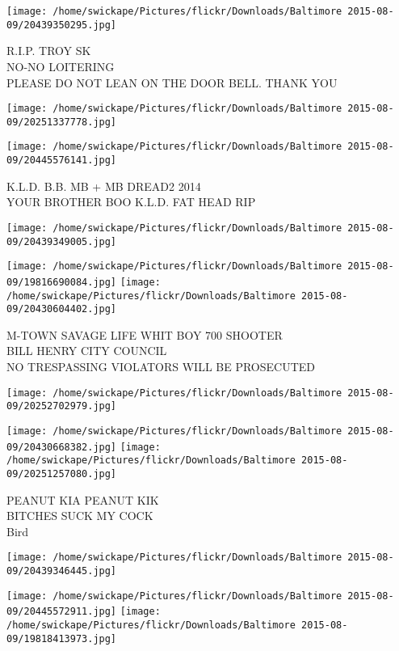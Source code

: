 \documentclass[10pt,letterpaper]{article}
\begin{document}
\texttt{[image: /home/swickape/Pictures/flickr/Downloads/Baltimore 2015-08-09/20439350295.jpg]}

R.I.P. TROY SK\\
NO{-}NO LOITERING\\
PLEASE DO NOT LEAN ON THE DOOR BELL.  THANK YOU
\pagebreak

\texttt{[image: /home/swickape/Pictures/flickr/Downloads/Baltimore 2015-08-09/20251337778.jpg]}

\vspace{0.25in}
\texttt{[image: /home/swickape/Pictures/flickr/Downloads/Baltimore 2015-08-09/20445576141.jpg]}

K.L.D. B.B. MB + MB DREAD2 2014\\
YOUR BROTHER BOO K.L.D. FAT HEAD RIP
\pagebreak

\texttt{[image: /home/swickape/Pictures/flickr/Downloads/Baltimore 2015-08-09/20439349005.jpg]}

\vspace{0.25in}
\texttt{[image: /home/swickape/Pictures/flickr/Downloads/Baltimore 2015-08-09/19816690084.jpg]}
\texttt{[image: /home/swickape/Pictures/flickr/Downloads/Baltimore 2015-08-09/20430604402.jpg]}

M{-}TOWN SAVAGE LIFE WHIT BOY 700 SHOOTER\\
BILL HENRY CITY COUNCIL\\
NO TRESPASSING VIOLATORS WILL BE PROSECUTED
\pagebreak

\texttt{[image: /home/swickape/Pictures/flickr/Downloads/Baltimore 2015-08-09/20252702979.jpg]}

\vspace{0.25in}
\texttt{[image: /home/swickape/Pictures/flickr/Downloads/Baltimore 2015-08-09/20430668382.jpg]}
\texttt{[image: /home/swickape/Pictures/flickr/Downloads/Baltimore 2015-08-09/20251257080.jpg]}

PEANUT KIA PEANUT KIK\\
BITCHES SUCK MY COCK\\
Bird
\pagebreak

\texttt{[image: /home/swickape/Pictures/flickr/Downloads/Baltimore 2015-08-09/20439346445.jpg]}

\vspace{0.25in}
\texttt{[image: /home/swickape/Pictures/flickr/Downloads/Baltimore 2015-08-09/20445572911.jpg]}
\texttt{[image: /home/swickape/Pictures/flickr/Downloads/Baltimore 2015-08-09/19818413973.jpg]}
\end{document}
